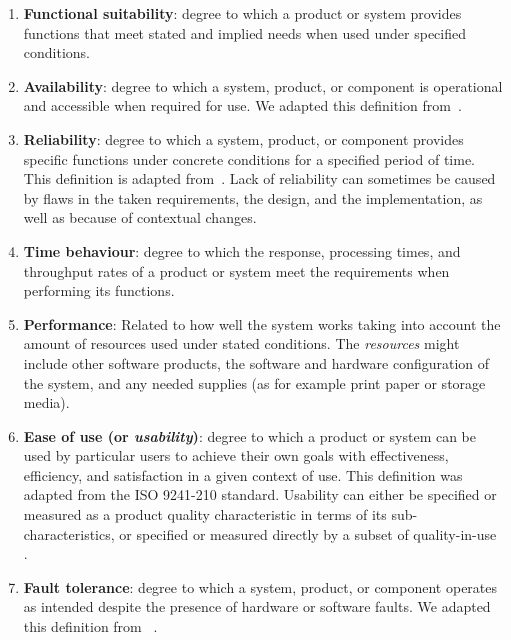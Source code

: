 \begin{enumerate}
    \item \textbf{Functional suitability}: degree to which a product or system provides functions that meet stated and implied needs when used under specified conditions.

    \item \textbf{Availability}: degree to which a system, product, or component is operational and accessible when required for use. We adapted this definition from~\cite{iso_central_secretary_isoiecieee_2010}.

    \item \textbf{Reliability}: degree to which a system, product, or component provides specific functions under concrete conditions for a specified period of time. This definition is adapted from~\cite{iso_central_secretary_isoiecieee_2010}. Lack of reliability can sometimes be caused by flaws in the taken requirements, the design, and the implementation, as well as because of contextual changes.  

    \item \textbf{Time behaviour}: degree to which the response, processing times, and throughput rates of a product or system meet the requirements when performing its functions.

    \item \textbf{Performance}:  Related to how well the system works taking into account the amount of resources used under stated conditions. The \textit{resources} might include other software products, the software and hardware configuration of the system, and any needed supplies (as for example print paper or storage media).

    \item \textbf{Ease of use (or \textit{usability})}: degree to which a product or system can be used by particular users to achieve their own goals with effectiveness, efficiency, and satisfaction in a given context of use. This definition was adapted from the ISO 9241-210 standard. Usability can either be specified or measured as a product quality characteristic in terms of its sub-characteristics, or specified or measured directly by a subset of quality-in-use .

    \item \textbf{Fault tolerance}: degree to which a system, product, or component operates as intended despite the presence of hardware or software faults. We adapted this definition from ~\cite{iso_central_secretary_isoiecieee_2010}.


\end{enumerate}
